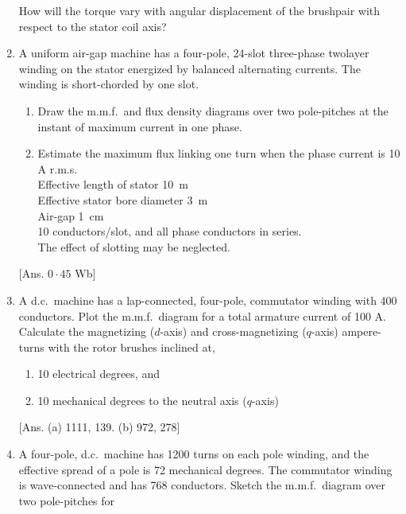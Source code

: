 \documentclass[a4paper,numbers=noenddot,12pt]{scrbook}
\begin{document}
\begin{enumerate}[label={\thechapter.\arabic*},leftmargin=*]
                    How will the torque vary with angular displacement of the brush­pair with respect to the stator coil axis?
                \item A uniform air-gap machine has a four-pole, 24-slot three-phase two­layer winding on the stator energized by balanced alternating currents. The winding is short-chorded by one slot.
                    \begin{enumerate}
                        \item Draw the m.m.f.\ and flux density diagrams over two pole-pitches at the instant of maximum current in one phase.
                        \item Estimate the maximum flux linking one turn when the phase current is 10 A r.m.s.\\
                            Effective length of stator \SI{10}{\meter}\\
                            Effective stator bore diameter \SI{3}{\meter}\\
                            Air-gap \SI{1}{\centi\meter}\\
                            10 conductors/slot, and all phase conductors in series.\\
                            The effect of slotting may be neglected.
                    \end{enumerate}
                    [Ans. $0\cdot45$ Wb]
                \item A d.c.\ machine has a lap-connected, four-pole, commutator winding with 400 conductors. Plot the m.m.f.\ diagram for a total armature current of 100 A.
                    Calculate the magnetizing ($d$-axis) and cross-magnetizing ($q$-axis) ampere-turns with the rotor brushes inclined at,
                    \begin{enumerate}
                        \item 10 electrical degrees, and
                        \item 10 mechanical degrees to the neutral axis ($q$-axis)
                    \end{enumerate}
                    [Ans. (a) 1111, 139. (b) 972, 278]
                \item A four-pole, d.c.\ machine has 1200 turns on each pole winding, and the effective spread of a pole is 72 mechanical degrees. The commutator winding is wave-connected and has 768 conductors.
                    Sketch the m.m.f.\ diagram over two pole-pitches for
                    \begin{enumerate}

\end{enumerate}
\end{enumerate}
\end{document}
